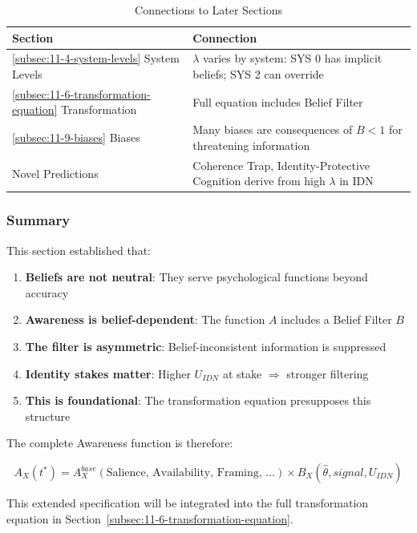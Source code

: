 \begin{table}[htbp]
\centering
\caption{Connections to Later Sections}
\label{tab:connections}
\renewcommand{\arraystretch}{1.3}
\begin{tabular}{@{}lp{7cm}@{}}
\toprule
\textbf{Section} & \textbf{Connection} \\
\midrule
\ref{subsec:11-4-system-levels} System Levels & 
$\lambda$ varies by system: SYS 0 has implicit beliefs; SYS 2 can override \\
\ref{subsec:11-6-transformation-equation} Transformation & 
Full equation includes Belief Filter \\
\ref{subsec:11-9-biases} Biases & 
Many biases are consequences of $B < 1$ for threatening information \\
Novel Predictions & 
Coherence Trap, Identity-Protective Cognition derive from high $\lambda$ in IDN \\
\bottomrule
\end{tabular}
\end{table}

\subsubsection{Summary}
\label{subsubsec:summary}

This section established that:

\begin{enumerate}
\item \textbf{Beliefs are not neutral}: They serve psychological functions beyond accuracy
\item \textbf{Awareness is belief-dependent}: The function $A$ includes a Belief Filter $B$
\item \textbf{The filter is asymmetric}: Belief-inconsistent information is suppressed
\item \textbf{Identity stakes matter}: Higher $U_{IDN}$ at stake $\Rightarrow$ stronger filtering
\item \textbf{This is foundational}: The transformation equation presupposes this structure
\end{enumerate}

The complete Awareness function is therefore:

\begin{equation}
\boxed{
A_X(t^*) = A^{base}_X(\text{Salience, Availability, Framing, ...}) \times B_X(\hat{\theta}, signal, U_{IDN})
}
\end{equation}

This extended specification will be integrated into the full transformation 
equation in Section~\ref{subsec:11-6-transformation-equation}.

